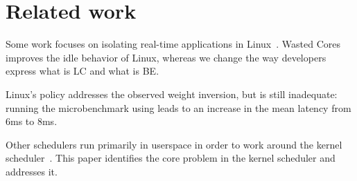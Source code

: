 \section{Related work}

Some work focuses on isolating real-time applications in
Linux~\cite{rt-in-linux, state-rt-linux}. Wasted Cores~\cite{wasted-cores}
improves the idle behavior of Linux, whereas we change the way developers
express what is LC and what is BE.

Linux's \schedidle{} policy addresses the observed weight inversion, but is
still inadequate: running the microbenchmark using \schedidle{} leads to an
increase in the mean latency from 6ms to 8ms.

Other schedulers run primarily in userspace in order to work around the kernel
scheduler~\cite{perfiso,caladan,skyloft}. This paper identifies the core problem
in the kernel scheduler and addresses it.